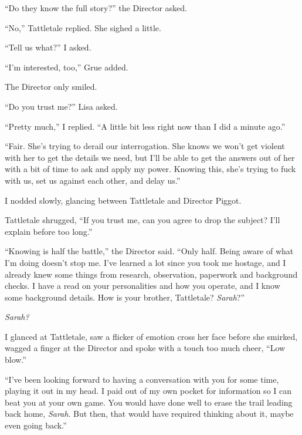 ``Do they know the full story?'' the Director asked.



``No,'' Tattletale replied.  She sighed a little.



``Tell us what?'' I asked.



``I'm interested, too,'' Grue added.



The Director only smiled.



``Do you trust me?''  Lisa asked.



``Pretty much,'' I replied.  ``A little bit less right now than I did a minute ago.''



``Fair.  She's trying to derail our interrogation.  She knows we won't get violent with her to get the details we need, but I'll be able to get the answers out of her with a bit of time to ask and apply my power.  Knowing this, she's trying to fuck with us, set us against each other, and delay us.''



I nodded slowly, glancing between Tattletale and Director Piggot.



Tattletale shrugged, ``If you trust me, can you agree to drop the subject?  I'll explain before too long.''



``Knowing is half the battle,'' the Director said.  ``Only half.  Being aware of what I'm doing doesn't stop me.  I've learned a lot since you took me hostage, and I already knew some things from research, observation, paperwork and background checks.  I have a read on your personalities and how you operate, and I know some background details.  How is your brother, Tattletale? \emph{Sarah}?''



\emph{Sarah?}



I glanced at Tattletale, saw a flicker of emotion cross her face before she smirked, wagged a finger at the Director and spoke with a touch too much cheer, ``Low blow.''



``I've been looking forward to having a conversation with you for some time, playing it out in my head.  I paid out of my own pocket for information so I can beat you at your own game.  You would have done well to erase the trail leading back home, \emph{Sarah}.  But then, that would have required thinking about it, maybe even going back.''



